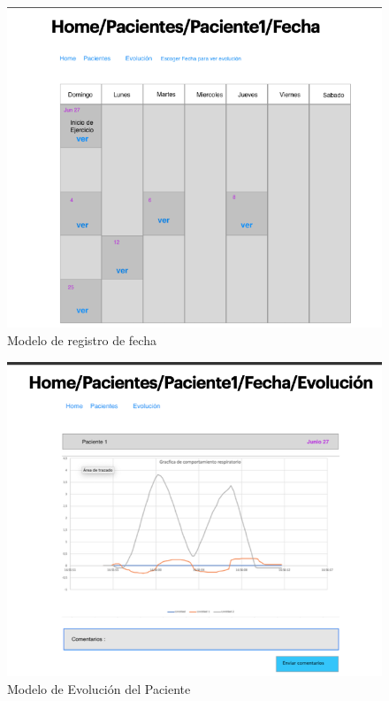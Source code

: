 \documentclass[12pt]{article}
\begin{document}
\begin{figure}[ht]
\centering
\includegraphics[scale=0.35]{imag/P8.png}
\caption{Modelo de registro de fecha }
\label{6}
\end{figure}
\FloatBarrier


\begin{figure}[ht]
\centering
\includegraphics[scale=0.4]{imag/P9.png}
\caption{Modelo de Evolución del Paciente }
\label{6}
\end{figure}
\FloatBarrier
\end{document}
